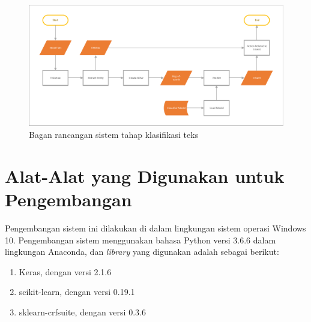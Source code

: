 \begin{figure}[H]
	\centering
	\includegraphics[width=\textwidth, trim=2 2 2 2, clip]{resources/3/design_classification.pdf}
	\caption{Bagan rancangan sistem tahap klasifikasi teks}
	\label{fig:design_classification}
\end{figure}

\section{Alat-Alat yang Digunakan untuk Pengembangan}

Pengembangan sistem ini dilakukan di dalam lingkungan sistem operasi Windows 10. Pengembangan sistem menggunakan bahasa Python versi 3.6.6 dalam lingkungan Anaconda, dan \textit{library} yang digunakan adalah sebagai berikut:

\begin{enumerate}
    \item Keras, dengan versi 2.1.6
    \item scikit-learn, dengan versi 0.19.1
    \item sklearn-crfsuite, dengan versi 0.3.6
\end{enumerate}